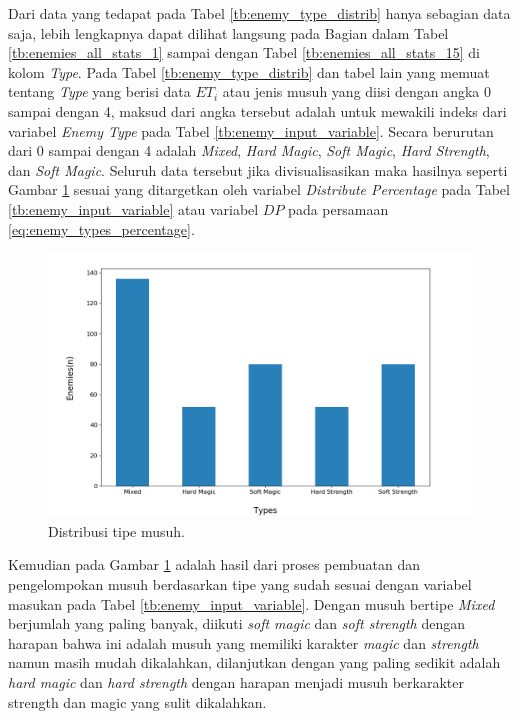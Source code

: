 Dari data yang tedapat pada Tabel \ref{tb:enemy_type_distrib} hanya sebagian data saja, lebih lengkapnya dapat dilihat langsung pada Bagian  dalam Tabel \ref{tb:enemies_all_stats_1} sampai dengan Tabel \ref{tb:enemies_all_stats_15} di kolom \textit{Type}. Pada Tabel \ref{tb:enemy_type_distrib} dan tabel lain yang memuat tentang \textit{Type} yang berisi data $ET_{i}$ atau jenis musuh yang diisi dengan angka 0 sampai dengan 4, maksud dari angka tersebut adalah untuk mewakili indeks dari variabel \textit{Enemy Type} pada Tabel \ref{tb:enemy_input_variable}. Secara berurutan dari 0 sampai dengan 4 adalah \textit{Mixed}, \textit{Hard Magic}, \textit{Soft Magic}, \textit{Hard Strength}, dan \textit{Soft Magic}. Seluruh data tersebut jika divisualisasikan maka hasilnya seperti Gambar \ref{fig:enemy_type_distrib} sesuai yang ditargetkan oleh variabel \textit{Distribute Percentage} pada Tabel \ref{tb:enemy_input_variable} atau variabel $DP$ pada persamaan \ref{eq:enemy_types_percentage}.

\begin{figure} [!h] \centering
	\includegraphics[scale=0.5]{img/EnemyTypeDistrib.png}
	\caption{Distribusi tipe musuh.}
	\label{fig:enemy_type_distrib}
\end{figure}

Kemudian pada Gambar \ref{fig:enemy_type_distrib} adalah hasil dari proses pembuatan dan pengelompokan musuh berdasarkan tipe yang sudah sesuai dengan variabel masukan pada Tabel \ref{tb:enemy_input_variable}. Dengan musuh bertipe \textit{Mixed} berjumlah yang paling banyak, diikuti \textit{soft magic} dan \textit{soft strength} dengan harapan bahwa ini adalah musuh yang memiliki karakter \textit{magic} dan \textit{strength} namun masih mudah dikalahkan, dilanjutkan dengan yang paling sedikit adalah \textit{hard magic} dan \textit{hard strength} dengan harapan menjadi musuh berkarakter strength dan magic yang sulit dikalahkan.
\vspace{1ex}

